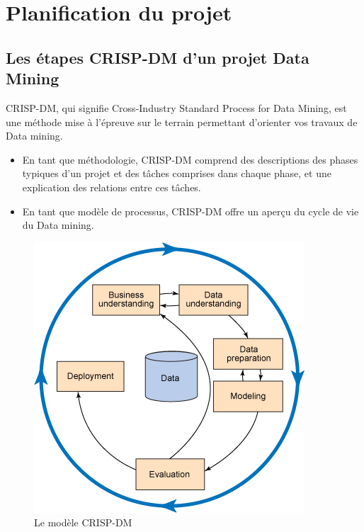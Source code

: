 \section{Planification du projet}
	\subsection{Les étapes CRISP-DM d'un projet Data Mining}
	CRISP-DM, qui signifie Cross-Industry Standard Process for Data Mining, est une méthode mise
à l’épreuve sur le terrain permettant d’orienter vos travaux de Data mining.\cite{CRISP-DM}
	\begin{itemize}
	\item En tant que méthodologie, CRISP-DM comprend des descriptions des phases typiques d’un
projet et des tâches comprises dans chaque phase, et une explication des relations entre ces
tâches.
	\item En tant que modèle de processus, CRISP-DM offre un aperçu du cycle de vie du Data mining.
	\end{itemize}
	\begin{figure}[H]
    		\centering
    		\includegraphics[scale=0.5]{crisp-dm}
    		\caption{Le modèle CRISP-DM}
    		\label{fig:crisp}
	\end{figure}

